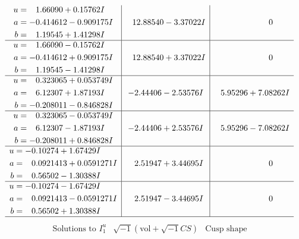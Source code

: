 \documentclass[1p]{elsarticle_modified}
\theoremstyle{definition}
\newcommand{\I}{\sqrt{-1}}
\begin{document}
$$\begin{array}{c|c|c}
\begin{aligned}
u &= \phantom{-}1.66090 + 0.15762 I \\
a &= -0.414612 - 0.909175 I \\
b &= \phantom{-}1.19545 + 1.41298 I\end{aligned}
 & \phantom{-}12.88540 - 3.37022 I & \phantom{-0.000000 } 0 \\ \hline\begin{aligned}
u &= \phantom{-}1.66090 - 0.15762 I \\
a &= -0.414612 + 0.909175 I \\
b &= \phantom{-}1.19545 - 1.41298 I\end{aligned}
 & \phantom{-}12.88540 + 3.37022 I & \phantom{-0.000000 } 0 \\ \hline\begin{aligned}
u &= \phantom{-}0.323065 + 0.053749 I \\
a &= \phantom{-}6.12307 + 1.87193 I \\
b &= -0.208011 - 0.846828 I\end{aligned}
 & -2.44406 - 2.53576 I & \phantom{-}5.95296 + 7.08262 I \\ \hline\begin{aligned}
u &= \phantom{-}0.323065 - 0.053749 I \\
a &= \phantom{-}6.12307 - 1.87193 I \\
b &= -0.208011 + 0.846828 I\end{aligned}
 & -2.44406 + 2.53576 I & \phantom{-}5.95296 - 7.08262 I \\ \hline\begin{aligned}
u &= -0.10274 + 1.67429 I \\
a &= \phantom{-}0.0921413 + 0.0591271 I \\
b &= \phantom{-}0.56502 - 1.30388 I\end{aligned}
 & \phantom{-}2.51947 + 3.44695 I & \phantom{-0.000000 } 0 \\ \hline\begin{aligned}
u &= -0.10274 - 1.67429 I \\
a &= \phantom{-}0.0921413 - 0.0591271 I \\
b &= \phantom{-}0.56502 + 1.30388 I\end{aligned}
 & \phantom{-}2.51947 - 3.44695 I & \phantom{-0.000000 } 0\\
 \hline 
 \end{array}$$\newpage$$\begin{array}{c|c|c}  
\text{Solutions to }I^u_{1}& \I (\text{vol} + \sqrt{-1}CS) & \text{Cusp shape}\\

\end{array}$$
\end{document}
